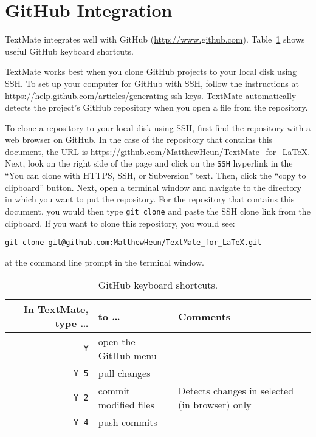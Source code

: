 \documentclass[10pt]{article}
\begin{document}
\section{GitHub Integration} %
\label{sec:github_integration}

TextMate integrates well with GitHub (\url{http://www.github.com}). 
Table~\ref{tab:github_keyboard_shortcuts} shows useful GitHub keyboard shortcuts.

TextMate works best when you clone GitHub projects to your local disk using SSH. 
To set up your computer for GitHub with SSH, follow the instructions at
\url{https://help.github.com/articles/generating-ssh-keys}. 
TextMate automatically detects the project's GitHub repository 
when you open a file from the repository.

To clone a repository to your local disk using SSH, 
first find the repository with a web browser on GitHub.
In the case of the repository that contains this document, 
the URL is \url{https://github.com/MatthewHeun/TextMate_for_LaTeX}. 
Next, look on the right side of the page and click on 
the \texttt{SSH} hyperlink in the 
``You can clone with HTTPS, SSH, or Subversion'' text.
Then, click the ``copy to clipboard'' button.
Next, open a terminal window and navigate to the directory in which you want to 
put the repository.
For the repository that contains this document, you would then type
\texttt{git clone} and paste the SSH clone link from the clipboard.
If you want to clone this repository, you would see:

\verb!git clone git@github.com:MatthewHeun/TextMate_for_LaTeX.git!

\noindent at the command line prompt in the terminal window.

\begin{table}
\centering
\caption{GitHub keyboard shortcuts.}
\begin{tabular}{r|l|l}
	In TextMate, type \dots & to \dots      & Comments                                       \\
	\hline
	\cmdkey\texttt{Y}           & open the GitHub menu            &                          \\
	\cmdkey\texttt{Y 5}         & pull changes                    &                          \\
	\cmdkey\texttt{Y 2}         & commit modified files           & Detects changes in selected (in browser) only \\
	\cmdkey\texttt{Y 4}         & push commits                    &                          \\
\end{tabular}
\label{tab:github_keyboard_shortcuts}
\end{table}
\end{document}
